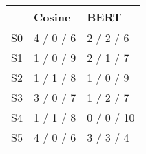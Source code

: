 \begin{tabular}{lll}
\toprule
 & Cosine & BERT \\
\midrule
S0 & 4 / 0 / 6 & 2 / 2 / 6 \\
S1 & 1 / 0 / 9 & 2 / 1 / 7 \\
S2 & 1 / 1 / 8 & 1 / 0 / 9 \\
S3 & 3 / 0 / 7 & 1 / 2 / 7 \\
S4 & 1 / 1 / 8 & 0 / 0 / 10 \\
S5 & 4 / 0 / 6 & 3 / 3 / 4 \\
\bottomrule
\end{tabular}
